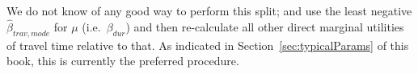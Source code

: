 

We do not know of any good way to perform this split; \citet{KickhoeferEtAl2011PolicyEvaluationIncome} and \citet{Kickhoefer_PhDThesis_2014} use the least negative $\hat\beta_{trav,mode}$ for $\mu$ (i.e.\ $\beta_{dur}$) and then re-calculate all other direct marginal utilities of travel time relative to that. As indicated in Section~\ref{sec:typicalParams} of this book, this is currently the preferred procedure.
%
%

